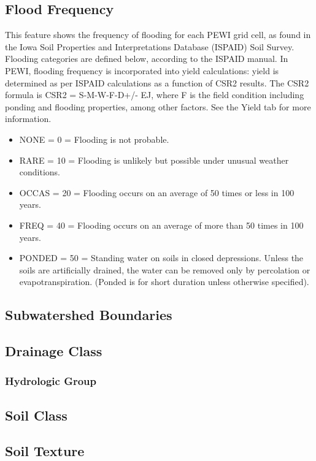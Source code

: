 \documentclass[11pt]{article}
\begin{document}
\subsection{Flood Frequency}
This feature shows the frequency of flooding for each PEWI grid cell, as found in the Iowa Soil Properties and Interpretations Database (ISPAID) Soil Survey.\cite{25}  Flooding categories are defined below, according to the ISPAID manual. In PEWI, flooding frequency is incorporated into yield calculations: yield is determined as per ISPAID calculations as a function of CSR2 results. The CSR2 formula is CSR2 = S-M-W-F-D+/- EJ, where F is the field condition including ponding and flooding properties, among other factors.  See the Yield tab for more information.
\begin{itemize}
\item NONE	=	0	=	Flooding is not probable.
\item RARE	=	10	=	Flooding is unlikely but possible under unusual weather conditions.
\item OCCAS	=	20	=	Flooding occurs on an average of 50 times or less in 100 years.
\item FREQ	=	40	=	Flooding occurs on an average of more than 50 times in 100 years.
\item PONDED	=	50	=	Standing water on soils in closed depressions.  Unless the soils are artificially drained, the water can be removed only by percolation or evapotranspiration.  (Ponded is for short duration unless otherwise specified).
\end{itemize}

\subsection{Subwatershed Boundaries}

\subsection{Drainage Class}

\subsubsection{Hydrologic Group}

\subsection{Soil Class}

\subsection{Soil Texture}
\end{document}
